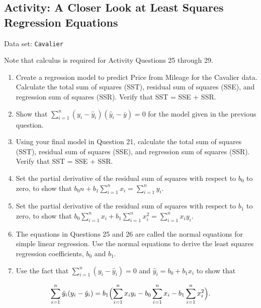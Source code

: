 \documentclass[
]{book}
\providecommand{\tightlist}{%
  \setlength{\itemsep}{0pt}\setlength{\parskip}{0pt}}
\begin{document}
\hypertarget{activity-a-closer-look-at-least-squares-regression-equations}{%
\subsection*{Activity: A Closer Look at Least Squares Regression Equations}\label{activity-a-closer-look-at-least-squares-regression-equations}}

Data set: \texttt{Cavalier}

Note that calculus is required for Activity Questions 25 through 29.

\begin{enumerate}
\def\labelenumi{\arabic{enumi}.}
\setcounter{enumi}{21}
\tightlist
\item
  Create a regression model to predict Price from Mileage for the Cavalier data. Calculate the total sum of squares (SST), residual sum of squares (SSE), and regression sum of squares (SSR). Verify that SST = SSE + SSR.\\
\item
  Show that \(\sum_{i=1}^n (y_i - \hat{y}_i)(\hat{y}_i - \bar{y}) = 0\) for the model given in the previous question.\\
\item
  Using your final model in Question 21, calculate the total sum of squares (SST), residual sum of squares (SSE), and regression sum of squares (SSR). Verify that SST = SSE + SSR.\\
\item
  Set the partial derivative of the residual sum of squares with respect to \(b_0\) to zero, to show that \(b_0 n + b_1 \sum_{i=1}^n x_i = \sum_{i=1}^n y_i.\)
\item
  Set the partial derivative of the residual sum of squares with respect to \(b_1\) to zero, to show that \(b_0 \sum_{i=1}^n x_i + b_1 \sum_{i=1}^n x_i^2 = \sum_{i=1}^n x_i y_i.\)
\item
  The equations in Questions 25 and 26 are called the normal equations for simple linear regression. Use the normal equations to derive the least squares regression coefficients, \(b_0\) and \(b_1\).\\
\item
  Use the fact that \(\sum_{i=1}^n (y_i - \hat{y}_i) = 0\) and \(\hat{y}_i = b_0 + b_1 x_i\) to show that
\end{enumerate}

\begin{equation}
\sum_{i=1}^n \hat{y}_i (y_i - \hat{y}_i)
  = b_1 \Bigl(\sum_{i=1}^n x_i y_i - b_0 \sum_{i=1}^n x_i - b_1 \sum_{i=1}^n x_i^2\Bigr).
  \notag
\end{equation}
\end{document}
